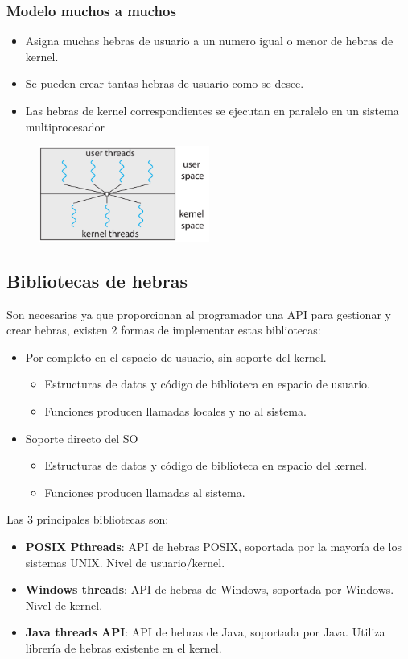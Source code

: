\documentclass{templateNote}
\begin{document}
\subsubsection*{Modelo muchos a muchos}
\begin{itemize}
    \item Asigna muchas hebras de usuario a un numero igual o menor de hebras de kernel.
    \item Se pueden crear tantas hebras de usuario como se desee.
    \item Las hebras de kernel correspondientes se ejecutan en paralelo en un sistema multiprocesador
\end{itemize}

\begin{figure}[H]
    \centering
    \includegraphics[width=0.5\textwidth]{img/muchos-muchos.png}
\end{figure}

\subsection*{Bibliotecas de hebras}
Son necesarias ya que proporcionan al programador una API para gestionar y crear hebras, existen 2 formas de implementar estas bibliotecas:
\begin{itemize}
    \item Por completo en el espacio de usuario, sin soporte del kernel.
    \begin{itemize}
        \item Estructuras de datos y código de biblioteca en espacio de usuario.
        \item Funciones producen llamadas locales y no al sistema.
    \end{itemize}
    \item Soporte directo del SO
    \begin{itemize}
        \item Estructuras de datos y código de biblioteca en espacio del kernel.
        \item Funciones producen llamadas al sistema.
    \end{itemize}
\end{itemize}
Las 3 principales bibliotecas son:
\begin{itemize}
    \item \textbf{POSIX Pthreads}: API de hebras POSIX, soportada por la mayoría de los sistemas UNIX. Nivel de usuario/kernel.
    \item \textbf{Windows threads}: API de hebras de Windows, soportada por Windows. Nivel de kernel.
    \item \textbf{Java threads API}: API de hebras de Java, soportada por Java. Utiliza librería de hebras existente en el kernel.
\end{itemize}
\end{document}
